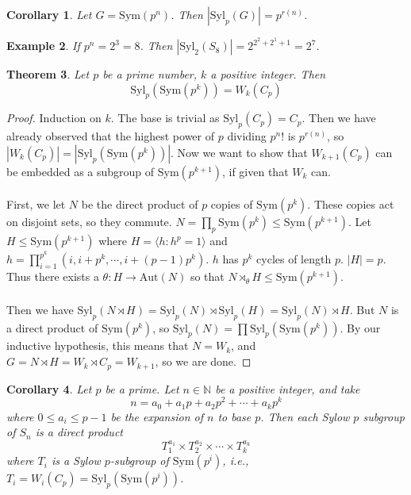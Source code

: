 \documentclass[a4paper,10pt]{article}
\newcommand{\NN}{\mathbb{N}}
\newtheorem{thm}{Theorem}
\newtheorem{Cor}[thm]{Corollary}
\newtheorem{eg}[thm]{Example}
\begin{document}
\begin{Cor}
Let $G = \text{Sym}(p^n)$. Then $| \text{Syl}_p(G)| = p^{r(n)}$. 
\end{Cor}

\begin{eg}
If $p^n = 2^3 = 8$. Then $|\text{Syl}_2(S_8)| = 2^{2^2 + 2^1 + 1} = 2^7$.
\end{eg}

\begin{thm}
Let $p$ be a prime number, $k$ a positive integer. Then
\[ \text{Syl}_p( \text{Sym}(p^k)) = W_k (C_p) \]
\end{thm}

\begin{proof}
Induction on $k$. The base is trivial as $\text{Syl}_p(C_p) = C_p$. Then we have already observed that the highest power of $p$ dividing $p^n !$ is $p^{r(n)}$, so $|W_k(C_p)| = |\text{Syl}_p( \text{Sym}(p^k))|$. Now we want to show that $W_{k+1}(C_p)$ can be embedded as a subgroup of $\text{Sym}(p^{k+1})$, if given that $W_k$ can.  \\
\\
First, we let $N$ be the direct product of $p$ copies of  $\text{Sym}(p^k)$. These copies act on disjoint sets, so they commute. $N = \prod_p \text{Sym}(p^k) \leq \text{Sym}(p^{k+1})$. Let $H \leq \text{Sym}(p^{k+1})$ where $H = \langle h : h^p = 1 \rangle$ and $h = \prod_{i = 1}^{p^k} (i, i + p^k, \cdots, i + (p-1) p^k )$.  $h$ has $p^k$ cycles of length $p$. $|H| = p$. Thus there exists a $\theta : H \rightarrow \text{Aut}(N)$ so that $N \rtimes_\theta H \leq \text{Sym}(p^{k+1})$. \\
\\
Then we have $\text{Syl}_p(N \rtimes H) = \text{Syl}_p(N) \rtimes \text{Syl}_p(H) = \text{Syl}_p(N) \rtimes H$. But $N$ is a direct product of $\text{Sym}(p^k)$, so $\text{Syl}_p(N) = \prod \text{Syl}_p ( \text{Sym}(p^k))$. By our inductive hypothesis, this means that $N = W_k$, and $G = N \rtimes H = W_k \rtimes C_p = W_{k+1}$, so we are done.
\end{proof}

\begin{Cor}
Let $p$ be a prime. Let $n \in \NN$ be a positive integer, and take  
\[ n = a_0 + a_1 p + a_2 p^2 + \cdots + a_k p^k \]
where $0 \leq a_i \leq p-1$ be the expansion of $n$ to base $p$. Then each Sylow $p$ subgroup of $S_n$ is a direct product 
\[ T_1^{a_1} \times T_2^{a_2} \times \cdots \times T_k^{a_k} \]
where $T_i$ is a Sylow $p$-subgroup of $\text{Sym}(p^i)$, i.e., $T_i = W_i (C_p) = \text{Syl}_p ( \text{Sym}(p^i))$. 
\end{Cor}
\end{document}
